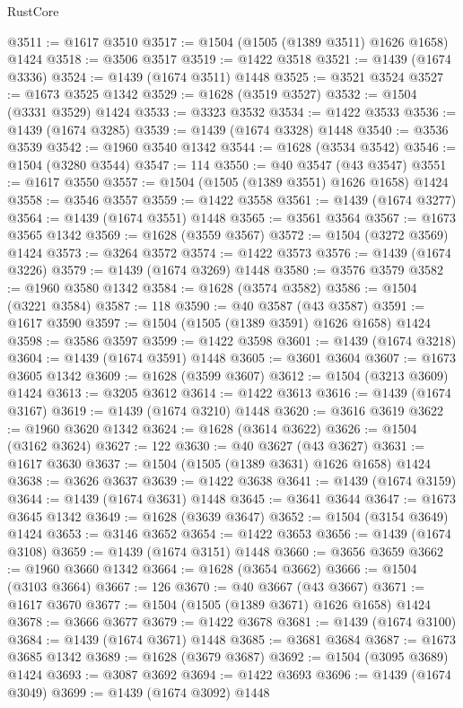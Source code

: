 \begin{lexlean}{RustCore}
\begin{coremodule}
@3511 := @1617 @3510
@3517 := @1504 (@1505 (@1389 @3511) @1626 @1658) @1424
@3518 := @3506 @3517
@3519 := @1422 @3518
@3521 := @1439 (@1674 @3336)
@3524 := @1439 (@1674 @3511) @1448
@3525 := @3521 @3524
@3527 := @1673 @3525 @1342
@3529 := @1628 (@3519 @3527)
@3532 := @1504 (@3331 @3529) @1424
@3533 := @3323 @3532
@3534 := @1422 @3533
@3536 := @1439 (@1674 @3285)
@3539 := @1439 (@1674 @3328) @1448
@3540 := @3536 @3539
@3542 := @1960 @3540 @1342
@3544 := @1628 (@3534 @3542)
@3546 := @1504 (@3280 @3544)
@3547 := 114
@3550 := @40 @3547 (@43 @3547)
@3551 := @1617 @3550
@3557 := @1504 (@1505 (@1389 @3551) @1626 @1658) @1424
@3558 := @3546 @3557
@3559 := @1422 @3558
@3561 := @1439 (@1674 @3277)
@3564 := @1439 (@1674 @3551) @1448
@3565 := @3561 @3564
@3567 := @1673 @3565 @1342
@3569 := @1628 (@3559 @3567)
@3572 := @1504 (@3272 @3569) @1424
@3573 := @3264 @3572
@3574 := @1422 @3573
@3576 := @1439 (@1674 @3226)
@3579 := @1439 (@1674 @3269) @1448
@3580 := @3576 @3579
@3582 := @1960 @3580 @1342
@3584 := @1628 (@3574 @3582)
@3586 := @1504 (@3221 @3584)
@3587 := 118
@3590 := @40 @3587 (@43 @3587)
@3591 := @1617 @3590
@3597 := @1504 (@1505 (@1389 @3591) @1626 @1658) @1424
@3598 := @3586 @3597
@3599 := @1422 @3598
@3601 := @1439 (@1674 @3218)
@3604 := @1439 (@1674 @3591) @1448
@3605 := @3601 @3604
@3607 := @1673 @3605 @1342
@3609 := @1628 (@3599 @3607)
@3612 := @1504 (@3213 @3609) @1424
@3613 := @3205 @3612
@3614 := @1422 @3613
@3616 := @1439 (@1674 @3167)
@3619 := @1439 (@1674 @3210) @1448
@3620 := @3616 @3619
@3622 := @1960 @3620 @1342
@3624 := @1628 (@3614 @3622)
@3626 := @1504 (@3162 @3624)
@3627 := 122
@3630 := @40 @3627 (@43 @3627)
@3631 := @1617 @3630
@3637 := @1504 (@1505 (@1389 @3631) @1626 @1658) @1424
@3638 := @3626 @3637
@3639 := @1422 @3638
@3641 := @1439 (@1674 @3159)
@3644 := @1439 (@1674 @3631) @1448
@3645 := @3641 @3644
@3647 := @1673 @3645 @1342
@3649 := @1628 (@3639 @3647)
@3652 := @1504 (@3154 @3649) @1424
@3653 := @3146 @3652
@3654 := @1422 @3653
@3656 := @1439 (@1674 @3108)
@3659 := @1439 (@1674 @3151) @1448
@3660 := @3656 @3659
@3662 := @1960 @3660 @1342
@3664 := @1628 (@3654 @3662)
@3666 := @1504 (@3103 @3664)
@3667 := 126
@3670 := @40 @3667 (@43 @3667)
@3671 := @1617 @3670
@3677 := @1504 (@1505 (@1389 @3671) @1626 @1658) @1424
@3678 := @3666 @3677
@3679 := @1422 @3678
@3681 := @1439 (@1674 @3100)
@3684 := @1439 (@1674 @3671) @1448
@3685 := @3681 @3684
@3687 := @1673 @3685 @1342
@3689 := @1628 (@3679 @3687)
@3692 := @1504 (@3095 @3689) @1424
@3693 := @3087 @3692
@3694 := @1422 @3693
@3696 := @1439 (@1674 @3049)
@3699 := @1439 (@1674 @3092) @1448

\end{coremodule}
\end{lexlean}
